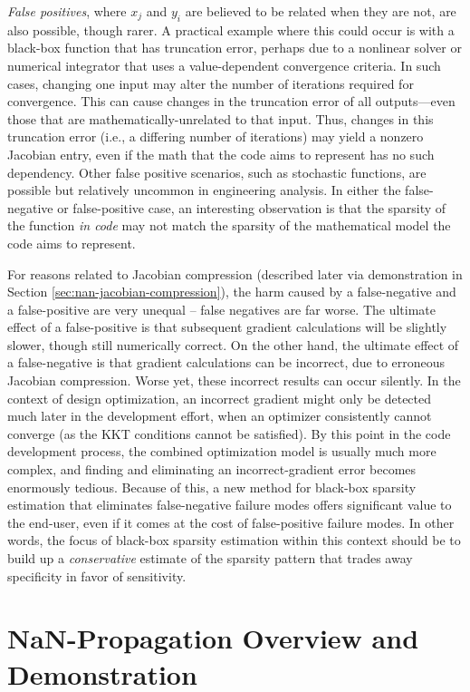 \emph{False positives}, where $x_j$ and $y_i$ are believed to be related when they are not, are also possible, though rarer. A practical example where this could occur is with a black-box function that has truncation error, perhaps due to a nonlinear solver or numerical integrator that uses a value-dependent convergence criteria. In such cases, changing one input may alter the number of iterations required for convergence. This can cause changes in the truncation error of all outputs—even those that are mathematically-unrelated to that input. Thus, changes in this truncation error (i.e., a differing number of iterations) may yield a nonzero Jacobian entry, even if the math that the code aims to represent has no such dependency. Other false positive scenarios, such as stochastic functions, are possible but relatively uncommon in engineering analysis. In either the false-negative or false-positive case, an interesting observation is that the sparsity of the function \emph{in code} may not match the sparsity of the mathematical model the code aims to represent.

For reasons related to Jacobian compression (described later via demonstration in Section \ref{sec:nan-jacobian-compression}), the harm caused by a false-negative and a false-positive are very unequal -- false negatives are far worse. The ultimate effect of a false-positive is that subsequent gradient calculations will be slightly slower, though still numerically correct. On the other hand, the ultimate effect of a false-negative is that gradient calculations can be incorrect, due to erroneous Jacobian compression. Worse yet, these incorrect results can occur silently. In the context of design optimization, an incorrect gradient might only be detected much later in the development effort, when an optimizer consistently cannot converge (as the KKT conditions cannot be satisfied). By this point in the code development process, the combined optimization model is usually much more complex, and finding and eliminating an incorrect-gradient error becomes enormously tedious. Because of this, a new method for black-box sparsity estimation that eliminates false-negative failure modes offers significant value to the end-user, even if it comes at the cost of false-positive failure modes. In other words, the focus of black-box sparsity estimation within this context should be to build up a \emph{conservative} estimate of the sparsity pattern that trades away specificity in favor of sensitivity.


\section{NaN-Propagation Overview and Demonstration}
\label{sec:nan-demo}

